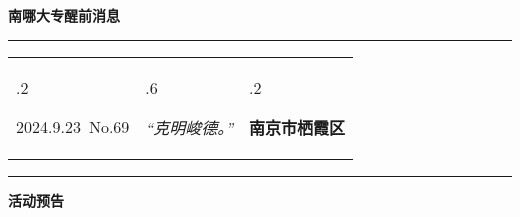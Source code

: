 \documentclass[letterpaper, 12pt]{article}
\begin{document}
\begin{center}
    \Huge\textbf{南哪大专醒前消息}
\end{center}
\vspace{4mm}
\hrule
\renewcommand\tabularxcolumn[1]{m{#1}}
\begin{tabularx}{\textwidth}{>{\hsize.2\hsize}X>{\hsize.6\hsize}X>{\hsize.2\hsize}X}
    \begin{flushleft}
        2024.9.23\, No.69
    \end{flushleft}
    &
    \begin{center}
        \textit{“克明峻德。”}
    \end{center}
    &
    \begin{flushright}
        \textbf{南京市栖霞区}
    \end{flushright}
\end{tabularx}
\vspace{-3.5mm}
\hrule
\vspace{4mm}
\centerline{\huge\textbf{活动预告}}
\end{document}
